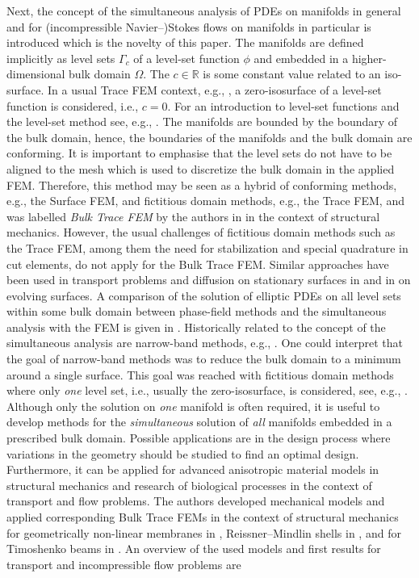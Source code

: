 \documentclass[12pt, twoside, english]{article}
\numberwithin{equation}{section}
\begin{document}
Next, the concept of the simultaneous analysis of PDEs on manifolds in general and for (incompressible Navier--)Stokes flows on manifolds in particular is introduced which is the novelty of this paper. The manifolds are defined implicitly as level sets $\Gamma_{\!c}$ of a level-set function $\phi$ and embedded in a higher-dimensional bulk domain $\Omega$. The $c \in \mathbb{R}$ is some constant value related to an iso-surface. In a usual Trace FEM context, e.g., \cite{Olshanskii_2018a,Olshanskii_2019a,Olshanskii_2022a,Jankuhn_2021a}, a zero-isosurface of a level-set function is considered, i.e., $c=0$. For an introduction to level-set functions and the level-set method see, e.g., \cite{Osher_2006a,Gomes_2009a}. The manifolds are bounded by the boundary of the bulk domain, hence, the boundaries of the manifolds and the bulk domain are conforming. It is important to emphasise that the level sets do not have to be aligned to the mesh which is used to discretize the bulk domain in the applied FEM. Therefore, this method may be seen as a hybrid of conforming methods, e.g., the Surface FEM, and fictitious domain methods, e.g., the Trace FEM, and was labelled \emph{Bulk Trace FEM} by the authors in \cite{Fries_2023a} in the context of structural mechanics. However, the usual challenges of fictitious domain methods such as the Trace FEM, among them the need for stabilization and special quadrature in cut elements, do not apply for the Bulk Trace FEM. Similar approaches have been used in transport problems and diffusion on stationary surfaces in \cite{Dziuk_2008a} and in \cite{Dziuk_2010a} on evolving surfaces. A comparison of the solution of elliptic PDEs on all level sets within some bulk domain between phase-field methods and the simultaneous analysis with the FEM is given in \cite{Burger_2009a}. Historically related to the concept of the simultaneous analysis are narrow-band methods, e.g., \cite{Deckelnick_2010a,Deckelnick_2014a,Bertalmio_2001a, Greer_2006a, Greer_2006b}. One could interpret that the goal of narrow-band methods was to reduce the bulk domain to a minimum around a single surface. This goal was reached with fictitious domain methods where only \emph{one} level set, i.e., usually the zero-isosurface, is considered, see, e.g., \cite{Olshanskii_2014a,Olshanskii_2017a,Chernyshenko_2015a,Grande_2016a,Burman_2015a,Burman_2018a,Cenanovic_2016a,Schoellhammer_2021a,Fries_2020a}. Although only the solution on \emph{one} manifold is often required, it is useful to develop methods for the \emph{simultaneous} solution of \emph{all} manifolds embedded in a prescribed bulk domain. Possible applications are in the design process where variations in the geometry should be studied to find an optimal design. Furthermore, it can be applied for advanced anisotropic material models in structural mechanics and research of biological processes in the context of transport and flow problems. The authors developed mechanical models and applied corresponding Bulk Trace FEMs in the context of structural mechanics for geometrically non-linear membranes in \cite{Fries_2023a,Fries_2023c,Kaiser_2023b}, Reissner--Mindlin shells in \cite{Kaiser_2024a}, and for Timoshenko beams in \cite{Kaiser_2024b}. An overview of the used models and first results for transport and incompressible flow problems are 
\end{document}
